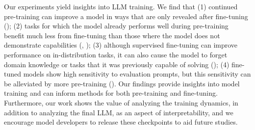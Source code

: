 Our experiments yield insights into LLM training.
We find that (1) continued pre-training can improve a model in ways that are only revealed after fine-tuning (); (2) tasks for which the model already performs well during pre-training benefit much less from fine-tuning than those where the model does not demonstrate capabilities (, ); (3) although supervised fine-tuning can improve performance on in-distribution tasks, it can also cause the model to forget domain knowledge or tasks that it was previously capable of solving (); (4) fine-tuned models show high sensitivity to evaluation prompts, but this sensitivity can be alleviated by more pre-training ().
Our findings provide insights into model training and can inform methods for both pre-training and fine-tuning. Furthermore, our work shows the value of analyzing the training dynamics, in addition to analyzing the final LLM, as an aspect of interpretability, and we encourage model developers to release these checkpoints to aid future studies.
